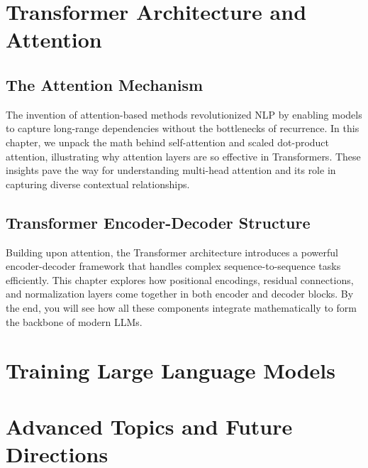 \documentclass[12pt]{book}
\begin{document}




\part{Transformer Architecture and Attention}

\chapter{The Attention Mechanism}
\noindent
The invention of attention-based methods revolutionized NLP by enabling models to capture long-range dependencies without the bottlenecks of recurrence. In this chapter, we unpack the math behind self-attention and scaled dot-product attention, illustrating why attention layers are so effective in Transformers. These insights pave the way for understanding multi-head attention and its role in capturing diverse contextual relationships.






\chapter{Transformer Encoder-Decoder Structure}
\noindent
Building upon attention, the Transformer architecture introduces a powerful encoder-decoder framework that handles complex sequence-to-sequence tasks efficiently. This chapter explores how positional encodings, residual connections, and normalization layers come together in both encoder and decoder blocks. By the end, you will see how all these components integrate mathematically to form the backbone of modern LLMs.




\part{Training Large Language Models}




\part{Advanced Topics and Future Directions}




\end{document}
